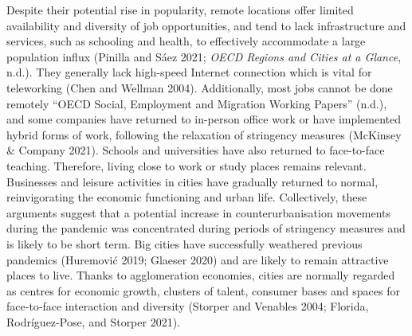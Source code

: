 \documentclass[11pt,letterpaper]{article}
\begin{document}
Despite their potential rise in popularity, remote locations offer
limited availability and diversity of job opportunities, and tend to
lack infrastructure and services, such as schooling and health, to
effectively accommodate a large population influx (Pinilla and Sáez
2021; \emph{OECD Regions and Cities at a Glance}, n.d.). They generally
lack high-speed Internet connection which is vital for teleworking (Chen
and Wellman 2004). Additionally, most jobs cannot be done remotely
{``OECD Social, Employment and Migration Working Papers''} (n.d.), and
some companies have returned to in-person office work or have
implemented hybrid forms of work, following the relaxation of stringency
measures (McKinsey \& Company 2021). Schools and universities have also
returned to face-to-face teaching. Therefore, living close to work or
study places remains relevant. Businesses and leisure activities in
cities have gradually returned to normal, reinvigorating the economic
functioning and urban life. Collectively, these arguments suggest that a
potential increase in counterurbanisation movements during the pandemic
was concentrated during periods of stringency measures and is likely to
be short term. Big cities have successfully weathered previous pandemics
(Huremović 2019; Glaeser 2020) and are likely to remain attractive
places to live. Thanks to agglomeration economies, cities are normally
regarded as centres for economic growth, clusters of talent, consumer
bases and spaces for face‐to‐face interaction and diversity (Storper and
Venables 2004; Florida, Rodríguez-Pose, and Storper 2021).
\end{document}
